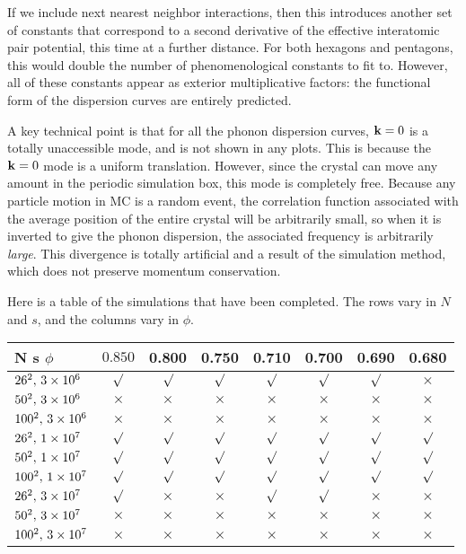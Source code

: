 \documentclass[12pt]{article}
\begin{document}
If we include next nearest neighbor interactions, then this introduces another set of constants that correspond to a second derivative of the effective interatomic pair potential, this time at a further distance. For both hexagons and pentagons, this would double the number of phenomenological constants to fit to. However, all of these constants appear as exterior multiplicative factors: the functional form of the dispersion curves are entirely predicted.

A key technical point is that for all the phonon dispersion curves, $\mathbf{k} = 0$ is a totally unaccessible mode, and is not shown in any plots. This is because the $\mathbf{k} = 0$ mode is a uniform translation. However, since the crystal can move any amount in the periodic simulation box, this mode is completely free. Because any particle motion in MC is a random event, the correlation function associated with the average position of the entire crystal will be arbitrarily small, so when it is inverted to give the phonon dispersion, the associated frequency is arbitrarily \emph{large}. This divergence is totally artificial and a result of the simulation method, which does not preserve momentum conservation.

Here is a table of the simulations that have been completed. The rows vary in $N$ and $s$, and the columns vary in $\phi$.
\begin{center}
\begin{tabular}{|| l ||c|c|c|c|c|c|c||} \hline \hline
N \quad s \quad $\phi$ & $0.850$ & 0.800 & 0.750 & 0.710 & 0.700 & 0.690 & 0.680 \\ \hline \hline
$26^2,\, 3\times10^{6}$ & $\surd$ & $\surd$ & $\surd$ & $\surd$ & $\surd$ & $\surd$ & $\times$ \\ \hline
$50^2, \,3\times10^{6}$ & $\times$ & $\times$ & $\times$ & $\times$ & $\times$ & $\times$ & $\times$ \\ \hline
$100^2,\, 3\times10^{6}$ & $\times$ & $\times$ & $\times$ & $\times$ & $\times$ & $\times$ & $\times$ \\ \hline
$26^2,\, 1\times10^{7}$ & $\surd$ & $\surd$ & $\surd$ & $\surd$ & $\surd$ & $\surd$ & $\surd$ \\ \hline
$50^2, \,1\times10^{7}$ & $\surd$ & $\surd$ & $\surd$ & $\surd$ & $\surd$ & $\surd$ & $\surd$ \\ \hline
$100^2,\, 1\times10^{7}$ & $\surd$ & $\surd$ & $\surd$ & $\surd$ & $\surd$ & $\surd$ & $\surd$ \\ \hline
$26^2,\, 3\times10^{7}$ & $\surd$ & $\times$ & $\times$ & $\surd$ & $\surd$ & $\times$ & $\times$ \\ \hline
$50^2, \,3\times10^{7}$ & $\times$ & $\times$ & $\times$ & $\times$ & $\times$ & $\times$ & $\times$ \\ \hline
$100^2,\, 3\times10^{7}$ & $\times$ & $\times$ & $\times$ & $\times$ & $\times$ & $\times$ & $\times$ \\ \hline \hline
\end{tabular}
\end{center}
\end{document}
